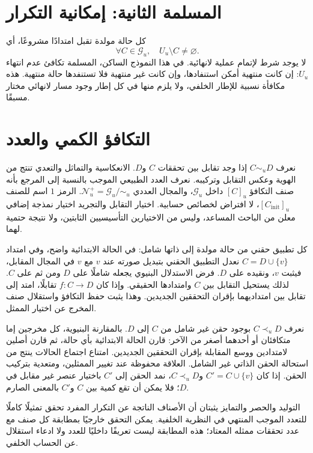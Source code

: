 \documentclass[12pt,a4paper]{article}
\begin{document}
\section{المسلمة الثانية: إمكانية التكرار}
كل حالة مولدة تقبل امتدادًا مشروعًا، أي
$$\forall C\in\mathcal G_u,\quad U_u\setminus C\ne\varnothing.$$
لا يوجد شرط لإتمام عملية لانهائية. في هذا النموذج الساكن، المسلمة تكافئ عدم انتهاء $U_u$: إن كانت منتهية أمكن استنفادها، وإن كانت غير منتهية فلا تستنفدها حالة منتهية. هذه مكافأة نسبية للإطار الخلفي، ولا يلزم منها في كل إطار وجود مسار لانهائي مختار مسبقًا.

\section{التكافؤ الكمي والعدد}
نعرف $C\sim_u D$ إذا وجد تقابل بين تحققات $C$ و$D$. الانعكاسية والتماثل والتعدي تنتج من الهوية وعكس التقابل وتركيبه. نعرف العدد الطبيعي الموجب بالنسبة إلى المرجع بأنه صنف التكافؤ $[C]_u$ داخل $\mathcal G_u$، والمجال العددي $\mathcal N_u^+=\mathcal G_u/{\sim_u}$. الرمز $1$ اسم للصنف $[C_{\mathrm{init}}]_u$، لا افتراض لخصائص حسابية. اختيار التقابل والتجريد اختيار نمذجة إضافي معلن من الباحث المساعد، وليس من الاختيارين التأسيسيين الثابتين، ولا نتيجة حتمية لهما.

كل تطبيق حقني من حالة مولدة إلى ذاتها شامل: في الحالة الابتدائية واضح، وفي امتداد $C=D\cup\{v\}$ نعدل التطبيق الحقني بتبديل صورته عند $v$ مع $v$ في المجال المقابل، فيثبت $v$، ونقيده على $D$. فرض الاستدلال البنيوي يجعله شاملًا على $D$ ومن ثم على $C$. لذلك يستحيل التقابل بين $C$ وامتدادها الحقيقي. وإذا كان $f:C\to D$ تقابلًا، امتد إلى تقابل بين امتداديهما بإقران التحققين الجديدين. وهذا يثبت حفظ التكافؤ واستقلال صنف المخرج عن اختيار الممثل.

نعرف $C\prec_u D$ بوجود حقن غير شامل من $C$ إلى $D$. بالمقارنة البنيوية، كل مخرجين إما متكافئان أو أحدهما أصغر من الآخر: قارن الحالة الابتدائية بأي حالة، ثم قارن أصلين لامتدادين ووسع المقابلة بإقران التحققين الجديدين. امتناع اجتماع الحالات ينتج من استحالة الحقن الذاتي غير الشامل. العلاقة محفوظة عند تغيير الممثلين، ومتعدية بتركيب الحقن. إذا كان $C'=C\cup\{v\}$ و$C\prec_u D$، نمد الحقن إلى $C'$ باختيار عنصر غير مقابل في $D$؛ فلا يمكن أن تقع كمية بين $C$ و$C'$ بالمعنى الصارم.

التوليد والحصر والتمايز يثبتان أن الأصناف الناتجة عن التكرار المفرد تحقق تمثيلًا كاملًا للتعدد الموجب المنتهي في النظرية الخلفية. يمكن التحقق خارجيًا بمطابقة كل صنف مع عدد تحققات ممثله المعتاد؛ هذه المطابقة ليست تعريفًا داخليًا للعدد ولا ادعاء استقلال عن الحساب الخلفي.
\end{document}
